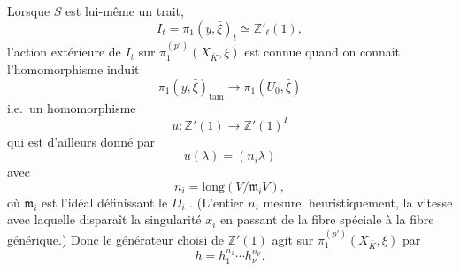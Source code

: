 \documentclass[11pt,a4paper]{article}
\begin{document}
Lorsque $S$ est lui-même un trait,  \struck{\ill{}}
\[
I_t = \pi_1(y, \bar\xi)_t \simeq \mathbb{Z}'_\ell(1) ,
\]
 l'action extérieure de $I_t$ sur $\pi_1^{(p')}(X_{\bar K}, \xi)$ est connue quand on connaît l'homomorphisme induit
\[
\pi_1(y, \bar\xi)_{\mathrm{tam}} \longrightarrow \pi_1(U_0, \bar\xi)
\]
i.e.\ un homomorphisme 
\[
u : \mathbb{Z}'(1) \longrightarrow \mathbb{Z}'(1)^I
\]
 qui est d'ailleurs donné par 
\[
u(\lambda) = (n_i \lambda)
\]
avec
\[
n_i = \mathrm{long}(V / \mathfrak{m}_i V) ,
\]
où $\mathfrak{m}_i$ est l'idéal définissant le  $D_i$ . (L'entier $n_i$ mesure, \struck{\ill{}} heuristiquement, la vitesse avec laquelle disparaît la singularité $x_i$ en passant de la fibre spéciale à la fibre générique.) Donc le générateur choisi de $\mathbb{Z}'(1)$ agit  sur $\pi_1^{(p')}(X_{\bar K}, \xi)$ par
\[
h = h_1^{n_1} \cdots h_\nu^{n_\nu} .
\]
\end{document}
